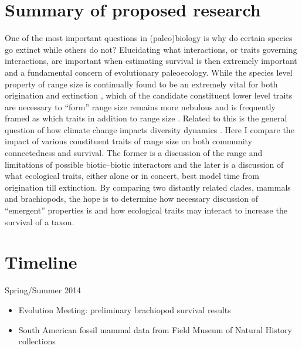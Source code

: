\documentclass[12pt,letterpaper]{article}
\begin{document}
\section{Summary of proposed research}
One of the most important questions in (paleo)biology is why do certain species go extinct while others do not? %
Elucidating what interactions, or traits governing interactions, are important when estimating survival is then extremely important and a fundamental concern of evolutionary paleoecology. While the species level property of range size is continually found to be an extremely vital for both origination and extinction \citep{Roy2009c,Foote2013,Jablonski2003,Jablonski1987,Harnik2013}, which of the candidate constituent lower level traits are necessary to ``form'' range size remains more nebulous and is frequently framed as which traits in addition to range size \citep{Foote2013,Harnik2011,Nurnberg2013a}. Related to this is the general question of how climate change impacts diversity dynamics \citep{Barnosky2001a,Alroy2000g,Figueirido2012,Olszewski2004}.
Here I compare the impact of various constituent traits of range size on both community connectedness and survival. The former is a discussion of the range and limitations of possible biotic--biotic interactors and the later is a discussion of what ecological traits, either alone or in concert, best model time from origination till extinction. By comparing two distantly related clades, mammals and brachiopods, the hope is to determine how necessary discussion of ``emergent'' properties is and how ecological traits may interact to increase the survival of a taxon.


\clearpage
\section{Timeline}

Spring/Summer 2014
\begin{itemize}
  \item Evolution Meeting: preliminary brachiopod survival results
  \item South American fossil mammal data from Field Museum of Natural History collections
\end{itemize}
\end{document}
